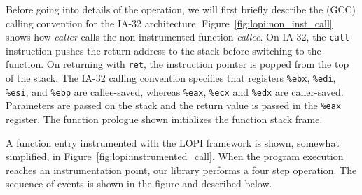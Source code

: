 \begin{figure*}[htb]
  \begin{center}
  \end{center}
  \caption[An instrumented function call]{A function call
    instrumented with our approach.}
  \label{fig:lopi:instrumented_call}
\end{figure*}

\begin{figure*}[htb]
  \begin{center}
  \end{center}
  \caption[An instrumented function return]{An instrumented function return.}
  \label{fig:lopi:instrumented_return}
\end{figure*}

Before going into details of the operation, we will first briefly
describe the (GCC) calling convention for the IA-32 architecture.
Figure~\ref{fig:lopi:non_inst_call} shows how \emph{caller} calls the
non-instrumented function \emph{callee}.  On IA-32, the
\texttt{call}-instruction pushes the return address to the stack before
switching to the function. On returning with \texttt{ret}, the instruction
pointer is popped from the top of the stack. The IA-32 calling convention
specifies that registers \texttt{\%ebx}, \texttt{\%edi}, \texttt{\%esi}, and
\texttt{\%ebp} are callee-saved, whereas \texttt{\%eax}, \texttt{\%ecx} and
\texttt{\%edx} are caller-saved. Parameters are passed on the stack and the
return value is passed in the \texttt{\%eax} register. The function prologue
shown initializes the function stack frame.

A function entry instrumented with the LOPI framework is shown, somewhat
simplified, in Figure~\ref{fig:lopi:instrumented_call}. When the program execution
reaches an instrumentation point, our library performs a four step operation.
The sequence of events is shown in the figure and described below.

